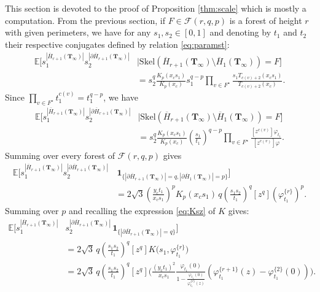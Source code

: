 \documentclass[10pt]{amsart}
\theoremstyle{definition}\newtheorem{defi}[theo]{Definition}\newtheorem{rema}[theo]{Remark}\newtheorem{exam}[theo]{Example}\newtheorem{exem}[theo]{Example}\newtheorem{nota}[theo]{Notation}
\begin{document}
This section is devoted to the proof of Proposition \ref{thm:scale} which is mostly a computation.
From the previous section, if $F \in \mathcal{F}(r,q,p)$ is a forest of height $r$ with given perimeters, we have for any $s_1,s_2 \in [0,1]$ and denoting by $t_1$ and $t_2$ their respective conjugates defined by relation \eqref{eq:paramst}:
\begin{align*}
\mathbb E \Big[
s_1^{|\overline{H}_{r+1} ( \mathbf{T}_{\infty})|} s_2^{|\partial \overline{H}_{r+1} (\mathbf{T}_{\infty})|}
& \Big| \mathrm{Skel} \left( \overline{H}_{r+1} (\mathbf{T}_{\infty}) \setminus \overline{H}_{1} (\mathbf{T}_{\infty})  \right) = F
\Big] \\
& = s_2^q \frac{K_p(x_c s_1)}{K_p (x_c)} s_1^{q-p} \prod_{v \in F^\star} \frac{s_1 T_{c(v) + 2}(x_c s_1)}{T_{c(v) + 2}(x_c)}.
\end{align*}
Since $\prod_{v \in F^\star} t_1^{c(v)} = t_1^{q-p}$, we have
\begin{align*}
\mathbb E \Big[
s_1^{|\overline{H}_{r+1} (\mathbf{T}_{\infty})|} s_2^{|\partial \overline{H}_{r+1} (\mathbf{T}_{\infty})|}
& \Big| \mathrm{Skel} \left( \overline{H}_{r+1} (\mathbf{T}_{\infty}) \setminus \overline{H}_{1} (\mathbf{T}_{\infty})  \right) = F
\Big]\\
& = s_2^q \frac{K_p(x_c s_1)}{K_p (x_c)} \left( \frac{s_1}{t_1}\right)^{q-p}\prod_{v \in F^\star} \frac{[z^{c(v)}] \varphi_{t_1}}{[z^{c(v)}] \varphi}.
\end{align*}
Summing over every forest of $\mathcal{F}(r,q,p)$ gives
\begin{align*}
\mathbb E \Big[
s_1^{|\overline{H}_{r+1} (\mathbf{T}_{\infty})|} s_2^{|\partial \overline{H}_{r+1} (\mathbf{T}_{\infty})|}
& \, \mathbf{1}_
{ \{ |\partial \overline{H}_{r+1} (\mathbf{T}_{\infty})| = q , |\partial \overline{H}_{1} (\mathbf{T}_{\infty})| = p \} }
\Big]\\
& = 2 \sqrt{3} \left( \frac{y_c t_1}{x_c s_1}\right)^{p}
K_p(x_c s_1) \,
q \left( \frac{s_1 s_2}{t_1}\right)^{q}[z^q] \left( \varphi_{t_1}^{\{r\}} \right)^p.
\end{align*}
Summing over $p$ and recalling the expression \eqref{eq:Ksz} of $K$ gives:
\begin{align*}
\mathbb E \Big[
s_1^{|\overline{H}_{r+1} (\mathbf{T}_{\infty})|} & s_2^{|\partial \overline{H}_{r+1} (\mathbf{T}_{\infty})|}
\, \mathbf{1}_
{ \{ |\partial \overline{H}_{r+1} (\mathbf{T}_{\infty})| = q \} }
\Big]\\
& = 2 \sqrt{3} \,
q \left( \frac{s_1 s_2}{t_1}\right)^{q}[z^q] K \big( s_1,\varphi_{t_1}^{\{r\}}  \big)\\
& = 2 \sqrt{3} \,
q \left( \frac{s_1 s_2}{t_1}\right)^{q}[z^q]
\Bigg(
\frac{(y_c {t_1})^2}{x_c {s_1}} \frac{\varphi_{t_1} (0)}{1 - \frac{\varphi_{t_1} (0)}{\varphi_{t_1}^{\{r\}}(z)}} \left(\varphi_{t_1}^{\{r+1\}} (z)- \varphi^{\{2\}}_{t_1}(0) \right)
\Bigg).
\end{align*}
\end{document}
